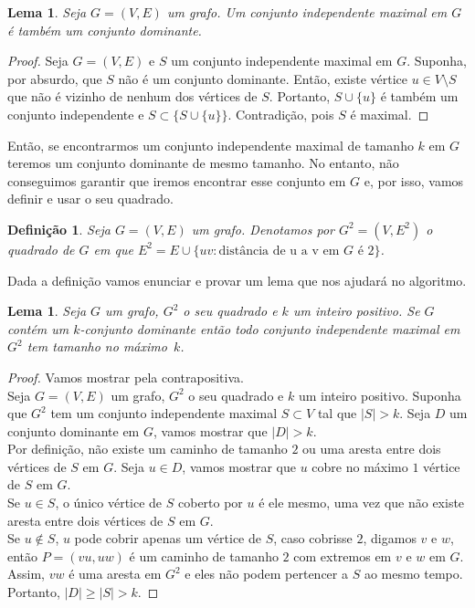 \documentclass[12pt]{article}
\newtheorem{lemma}[theorem]{Lema}
\newtheorem{definition}[theorem]{Definição}
\begin{document}
\begin{lemma}\label{lemma:2.8}
    Seja $G = (V,E)$ um grafo. Um conjunto independente maximal em $G$ é também um conjunto dominante.
\end{lemma}
\begin{proof}
    Seja $G = (V,E)$ e $S$ um conjunto independente maximal em $G$. Suponha, por absurdo, que $S$ não é um conjunto dominante. Então, existe vértice $u \in V \setminus S$ que não é vizinho de nenhum dos vértices de $S$. Portanto, $S \cup \{u\}$ é também um conjunto independente e $S \subset \{S \cup \{u\}\}$. Contradição, pois $S$ é maximal.
\end{proof}
Então, se encontrarmos um conjunto independente maximal de tamanho $k$ em $G$ teremos um conjunto dominante de mesmo tamanho. No entanto, não conseguimos garantir que iremos encontrar esse conjunto em $G$ e, por isso, vamos definir e usar o seu quadrado.
\begin{definition}
    Seja $G= (V,E)$ um grafo. Denotamos por $G^2 = (V,E^2)$ o \emph{quadrado} de $G$ em que $E^2 = E \cup \{uv: \text{distância de u a v em $G$ é $2$}\}$.
\end{definition}
Dada a definição vamos enunciar e provar um lema que nos ajudará no algoritmo.
\begin{lemma}\label{lemma:2.10}
    Seja $G$ um grafo, $G^2$ o seu quadrado e $k$ um inteiro positivo. Se $G$ contém um $k$-conjunto dominante então todo conjunto independente maximal em $G^2$ tem tamanho no máximo~$k$.
\end{lemma}
\begin{proof}
    Vamos mostrar pela contrapositiva.\\
    Seja $G = (V,E)$ um grafo, $G^2$ o seu quadrado e $k$ um inteiro positivo. Suponha que $G^2$ tem um conjunto independente maximal $S \subset V$ tal que $|S| > k$. Seja $D$ um conjunto dominante em $G$, vamos mostrar que $|D| > k$. \\
    Por definição, não existe um caminho de tamanho $2$ ou uma aresta entre dois vértices de $S$ em $G$. Seja $u \in D$, vamos mostrar que $u$ cobre no máximo $1$ vértice de $S$ em $G$. \\
    Se $u \in S$, o único vértice de $S$ coberto por $u$ é ele mesmo, uma vez que não existe aresta entre dois vértices de $S$ em $G$. \\
    Se $u \not \in S$, $u$ pode cobrir apenas um vértice de $S$, caso cobrisse $2$, digamos $v$ e $w$, então $P = (vu,uw)$ é um caminho de tamanho $2$ com extremos em $v$ e $w$ em $G$. Assim, $vw$ é uma aresta em $G^2$ e eles não podem pertencer a $S$ ao mesmo tempo. \\
    Portanto, $|D| \geq |S| > k$.
\end{proof}
\end{document}
